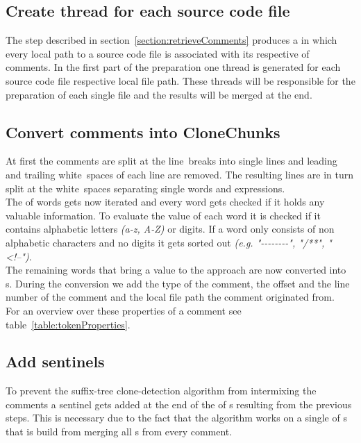 \subsection{Create thread for each source code file}
The step described in section~\ref{section:retrieveComments} produces a  in which every local path to a source code file is associated with its respective  of comments.
In the first part of the preparation one thread is generated for each source code file respective local file path. These threads will be responsible for the preparation of each single file and the results will be merged at the end.

\subsection{Convert comments into CloneChunks}
\label{section:convertToCloneChunks}
At first the comments are split at the line~breaks into single lines and leading and trailing white~spaces of each line are removed. The resulting lines are in turn split at the white~spaces separating single words and expressions.\\
The  of words gets now iterated and every word gets checked if it holds any valuable information. To evaluate the value of each word it is checked if it contains alphabetic letters \textit{(a-z, A-Z)} or digits. If a word only consists of non alphabetic characters and no digits it gets sorted out \textit{(e.g. "-{}-{}-{}-{}-{}-{}-{}-", "/**", "<!--")}.\\
The remaining words that bring a value to the approach are now converted into s. During the conversion we add the type of the comment, the offset and the line number of the comment and the local file path the comment originated from.\\
For an overview over these properties of a comment see table~\ref{table:tokenProperties}.

\subsection{Add sentinels}
To prevent the suffix-tree clone-detection algorithm from intermixing the comments a sentinel gets added at the end of the  of s resulting from the previous steps. This is necessary due to the fact that the algorithm works on a single  of s that is build from merging all s from every comment.

